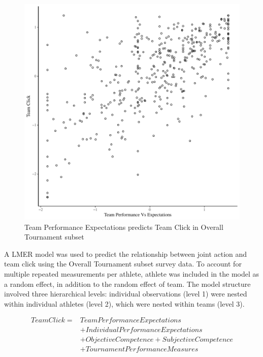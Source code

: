 \begin{CJK}{UTF8}{gbsn}
\begin{figure}[htbp]
  \centering
\includegraphics[scale=.5]{images/teamPerfClickOverallBasicXY.pdf}
  \caption{Team Performance Expectations predicts Team Click in Overall Tournament subset}
  \label{fig:teamPerfClickOverallBasicXY}
\end{figure}

A LMER model was used to predict the relationship between joint action and team click using the Overall Tournament subset survey data.  To account for multiple repeated measurements per athlete, athlete was included in the model as a random effect, in addition to the random effect of team.  The model structure involved three hierarchical levels: individual observations (level 1) were nested within individual athletes (level 2), which were nested within teams (level 3).


       \begin{align*}
         Team Click =  & Team Performance Expectations  \\
                   &+ Individual Performance Expectations   \\
                   &+ Objective Competence + Subjective Competence \\
                   &+ TournamentPerformanceMeasures  \\
       \end{align*}


\end{CJK}
